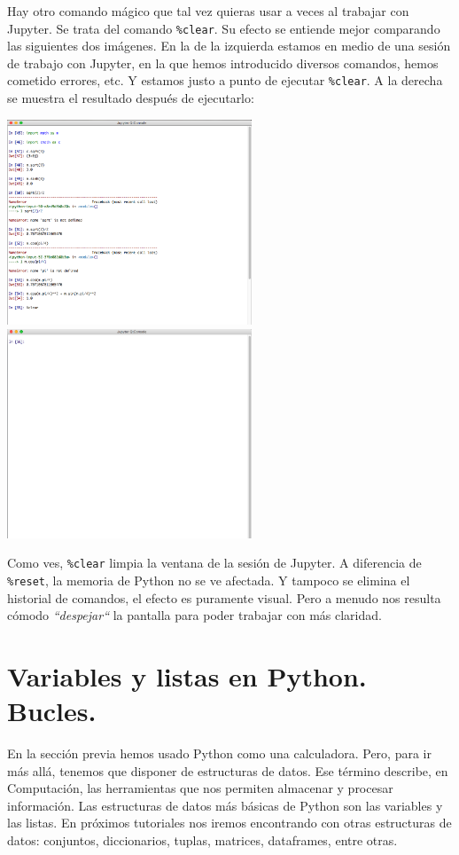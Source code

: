 \documentclass[10pt,a4paper]{article}\usepackage[]{graphicx}\usepackage[]{color}
\newcounter {cont01}
\begin{document}
Hay otro comando mágico que tal vez quieras usar a veces al trabajar con Jupyter. Se trata del comando \verb#%clear#.
Su efecto se entiende mejor comparando las siguientes dos imágenes. En la de la izquierda estamos en medio de una sesión de trabajo con Jupyter, en la que hemos introducido diversos comandos, hemos cometido errores, etc. Y estamos justo a punto de ejecutar  \verb#%clear#.
A la derecha se muestra el resultado después de ejecutarlo:
\begin{center}
\includegraphics[width=7.3cm]{../fig/Tut-02-py-02a.png}\quad
\includegraphics[width=7.3cm]{../fig/Tut-02-py-02b.png}
\end{center}
Como ves,  \verb#%clear#
limpia la ventana de la sesión de Jupyter. A diferencia de  \verb#%reset#,
la memoria de Python no se ve afectada. Y tampoco se elimina el historial de comandos, el efecto es puramente visual. Pero a menudo nos resulta cómodo {\em ``despejar``} la pantalla para poder trabajar con más claridad.

\section{Variables y listas en Python. Bucles.}
\label{tut02:sec:variablesListasPython}

En la sección previa hemos usado Python como una calculadora. Pero, para ir más allá, tenemos que disponer de {\sf estructuras de datos}. Ese término describe, en Computación, las herramientas que nos permiten almacenar y procesar información. Las estructuras de datos más básicas de Python son las {\sf variables} y las {\sf listas}. En próximos tutoriales nos iremos encontrando con otras estructuras de datos: conjuntos, diccionarios, tuplas, matrices, dataframes, entre otras.
\end{document}
